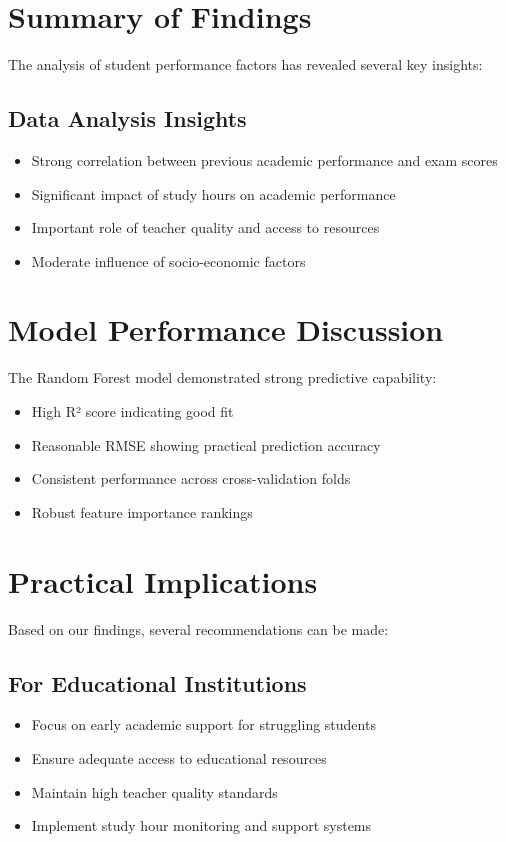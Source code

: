 \section{Summary of Findings}
The analysis of student performance factors has revealed several key insights:

\subsection{Data Analysis Insights}
\begin{itemize}
    \item Strong correlation between previous academic performance and exam scores
    \item Significant impact of study hours on academic performance
    \item Important role of teacher quality and access to resources
    \item Moderate influence of socio-economic factors
\end{itemize}

\section{Model Performance Discussion}
The Random Forest model demonstrated strong predictive capability:
\begin{itemize}
    \item High R² score indicating good fit
    \item Reasonable RMSE showing practical prediction accuracy
    \item Consistent performance across cross-validation folds
    \item Robust feature importance rankings
\end{itemize}

\section{Practical Implications}
Based on our findings, several recommendations can be made:

\subsection{For Educational Institutions}
\begin{itemize}
    \item Focus on early academic support for struggling students
    \item Ensure adequate access to educational resources
    \item Maintain high teacher quality standards
    \item Implement study hour monitoring and support systems
\end{itemize}

